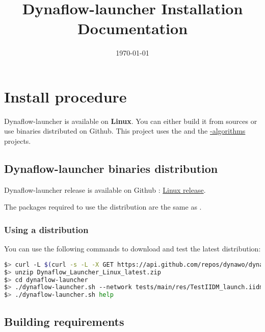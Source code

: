 \documentclass[a4paper, 12pt]{report}
\begin{document}
\title{Dynaflow-launcher Installation Documentation}
\date\today

\maketitle
\tableofcontents

\chapter{Install procedure}

Dynaflow-launcher is available on \textbf{Linux}.
You can either build it from sources or use binaries distributed on Github.
This project uses the \href{https://github.com/dynawo/dynawo}{\Dynawo}  and the \href{https://github.com/dynawo/dynawo-algorithms}{\Dynawo-algorithms} projects.

\section{Dynaflow-launcher binaries distribution}

Dynaflow-launcher release is available on Github : \href{https://github.com/dynawo/dynaflow-launcher/releases/download/v1.3.0/Dynaflow_Launcher_Linux_v1.3.0.zip}{Linux release}.

The packages required to use the distribution are the same as \Dynawo.

\subsection{Using a distribution}

You can use the following commands to download and test the latest distribution:
\begin{lstlisting}[language=bash, breaklines=true, breakatwhitespace=false]
$> curl -L $(curl -s -L -X GET https://api.github.com/repos/dynawo/dynaflow-launcher/releases/latest | grep "Dynaflow_Launcher_Linux" | grep url | cut -d '"' -f 4) -o Dynaflow_Launcher_Linux_latest.zip
$> unzip Dynaflow_Launcher_Linux_latest.zip
$> cd dynaflow-launcher
$> ./dynaflow-launcher.sh --network tests/main/res/TestIIDM_launch.iidm --config tests/main/res/config_launch.json
$> ./dynaflow-launcher.sh help
\end{lstlisting}

\section{Building requirements}
\end{document}

